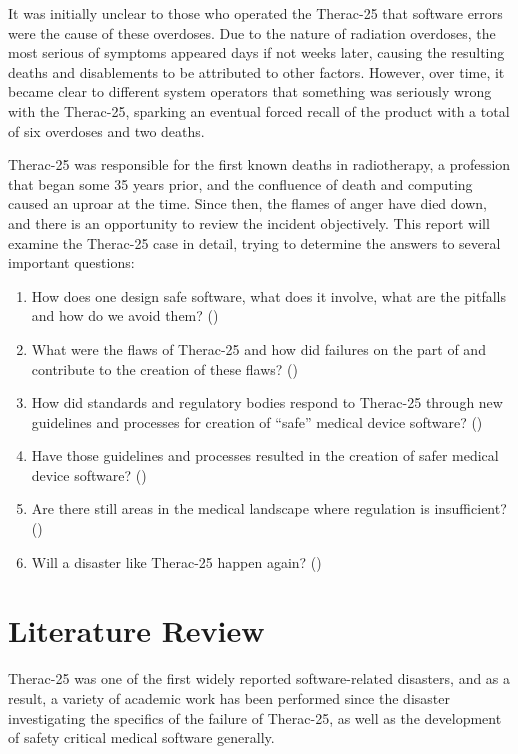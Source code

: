 \documentclass{cshonours}
\newcommand{\ther}{Therac-25\xspace}
\begin{document}
It was initially unclear to those who operated the \ther that software errors were the cause of these overdoses. Due to the nature of radiation overdoses, the most serious of symptoms appeared days if not weeks later, causing the resulting deaths and disablements to be attributed to other factors. However, over time, it became clear to different system operators that something was seriously wrong with the \ther, sparking an eventual forced \fda recall of the product with a total of six overdoses and two deaths.

\ther was responsible for the first known deaths in radiotherapy, a profession that began some 35 years prior, and the confluence of death and computing caused an uproar at the time. Since then, the flames of anger have died down, and there is an opportunity to review the incident objectively. This report will examine the \ther case in detail, trying to determine the answers to several important questions:
\begin{enumerate}
 \item How does one design safe software, what does it involve, what are the pitfalls and how do we avoid them? ()
 \item What were the flaws of \ther and how did failures on the part of \aecl and \cgr contribute to the creation of these flaws? ()
 \item How did standards and regulatory bodies respond to \ther through new guidelines and processes for creation of ``safe'' medical device software? ()
 \item Have those guidelines and processes resulted in the creation of safer medical device software? () 
 \item Are there still areas in the medical landscape where regulation is insufficient? ()
 \item Will a disaster like \ther happen again? ()
\end{enumerate}


\chapter{Literature Review}
\label{chap:litreview}
\ther was one of the first widely reported software-related disasters, and as a result, a variety of academic work has been performed since the disaster investigating the specifics of the failure of \ther, as well as the development of safety critical  medical software generally.
\end{document}
